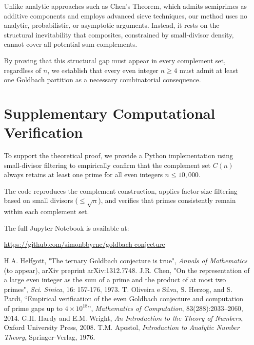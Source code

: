 \documentclass[11pt]{article}
\begin{document}
	Unlike analytic approaches such as Chen's Theorem, which admits semiprimes as additive components and employs advanced sieve techniques, our method uses no analytic, probabilistic, or asymptotic arguments. Instead, it rests on the structural inevitability that composites, constrained by small-divisor density, cannot cover all potential sum complements.
	
	By proving that this structural gap must appear in every complement set, regardless of \( n \), we establish that every even integer \( n \geq 4 \) must admit at least one Goldbach partition as a necessary combinatorial consequence.


	
	
	\section*{Supplementary Computational Verification}
	
	To support the theoretical proof, we provide a Python implementation using small-divisor filtering to empirically confirm that the complement set \( C(n) \) always retains at least one prime for all even integers \( n \leq 10,000 \). 
	
	The code reproduces the complement construction, applies factor-size filtering based on small divisors (\( \leq \sqrt{n} \)), and verifies that primes consistently remain within each complement set.
	
	The full Jupyter Notebook is available at:
	
	\url{https://github.com/simonbbyrne/goldbach-conjecture}


	
	
	\begin{thebibliography}{9}
		 H.A. Helfgott, "The ternary Goldbach conjecture is true", \emph{Annals of Mathematics} (to appear), arXiv preprint arXiv:1312.7748.
		 J.R. Chen, "On the representation of a large even integer as the sum of a prime and the product of at most two primes", \emph{Sci. Sinica}, 16: 157-176, 1973.
		 T. Oliveira e Silva, S. Herzog, and S. Pardi, ``Empirical verification of the even Goldbach conjecture and computation of prime gaps up to \( 4 \times 10^{18} \)'', \emph{Mathematics of Computation}, 83(288):2033--2060, 2014.
		 G.H. Hardy and E.M. Wright, \emph{An Introduction to the Theory of Numbers}, Oxford University Press, 2008.
		 T.M. Apostol, \emph{Introduction to Analytic Number Theory}, Springer-Verlag, 1976.
	\end{thebibliography}

	
\end{document}
